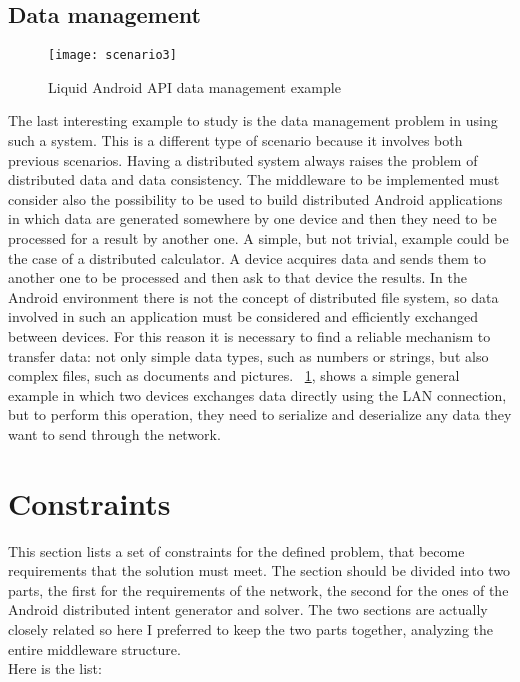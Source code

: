 \subsection{Data management}
\begin{figure}[h!]
	\centering
	\texttt{[image: scenario3]}
	\caption{Liquid Android API data management example}
	\label{fig:3.5}
\end{figure}
The last interesting example to study is the data management problem in using such a system. This is a different type of scenario because it involves both previous scenarios. Having a distributed system always raises the problem of distributed data and data consistency. The middleware to be implemented must consider also the possibility to be used to build distributed Android applications in which data are generated somewhere by one device and then they need to be processed for a result by another one. A simple, but not trivial, example could be the case of a distributed calculator. A device acquires data and sends them to another one to be processed and then ask to that device the results. In the Android environment there is not the concept of distributed file system, so data involved in such an application must be considered and efficiently exchanged between devices. For this reason it is necessary to find a reliable mechanism to transfer data: not only simple data types, such as numbers or strings, but also complex files, such as documents and pictures. \figurename~\ref{fig:3.5}, shows a simple general example in which two devices exchanges data directly using the LAN connection, but to perform this operation, they need to serialize and deserialize any data they want to send through the network. 

\section{Constraints} \label{problemconstraints}
This section lists a set of constraints for the defined problem, that become requirements that the solution must meet. The section should be divided into two parts, the first for the requirements of the network, the second for the ones of the Android distributed intent generator and solver. The two sections are actually closely related so here I preferred to keep the two parts together, analyzing the entire middleware structure.\\ 
Here is the list:


